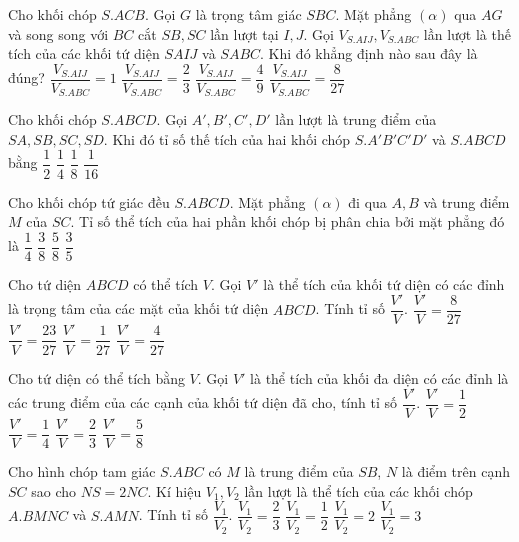 \begin{ex}%
	Cho khối chóp $S.ACB$. Gọi $G$ là trọng tâm giác $SBC$. Mặt phẳng $(\alpha)$ qua $AG$ và song song với $BC$ cắt $SB, SC$ lần lượt tại $I, J$. Gọi $V_{S.AIJ}, V_{S.ABC}$ lần lượt là thế tích của các khối tứ diện $SAIJ$ và $SABC$. Khi đó khẳng định nào sau đây là đúng?
	\choice
	{$\dfrac{V_{S.AIJ}}{V_{S.ABC}}=1$}
	{$\dfrac{V_{S.AIJ}}{V_{S.ABC}}=\dfrac{2}{3}$}
	{\True $\dfrac{V_{S.AIJ}}{V_{S.ABC}}=\dfrac{4}{9}$}
	{$\dfrac{V_{S.AIJ}}{V_{S.ABC}}=\dfrac{8}{27}$}
\end{ex}

\begin{ex}%
	Cho khối chóp $S.ABCD$. Gọi $A', B', C', D'$ lần lượt là trung điểm của $SA, SB, SC, SD$. Khi đó tỉ số thế tích của hai khối chóp $S.A'B'C'D'$ và $S.ABCD$ bằng 
	\choice
	{$\dfrac{1}{2}$}
	{$\dfrac{1}{4}$}
	{\True $\dfrac{1}{8}$}
	{$\dfrac{1}{16}$}
\end{ex}

\begin{ex}%
	Cho khối chóp tứ giác đều $S.ABCD$. Mặt phẳng $(\alpha)$ đi qua $A, B$ và trung điểm $M$ của $SC$. Tỉ số thể tích của hai phần khối chóp bị phân chia bởi mặt phẳng đó là
	\choice
	{$\dfrac{1}{4}$}
	{$\dfrac{3}{8}$}
	{$\dfrac{5}{8}$}
	{\True $\dfrac{3}{5}$}
\end{ex}

\begin{ex}%
	Cho tứ diện $ABCD$ có thể tích $V$. Gọi $V'$ là thể tích của khối tứ diện có các đỉnh là trọng tâm của các mặt của khối tứ diện $ABCD$. Tính tỉ số $\dfrac{V'}{V}$. 
	\choice
	{$\dfrac{V'}{V}=\dfrac{8}{27}$}
	{$\dfrac{V'}{V}=\dfrac{23}{27}$}
	{\True $\dfrac{V'}{V}=\dfrac{1}{27}$}
	{$\dfrac{V'}{V}=\dfrac{4}{27}$}
\end{ex}

\begin{ex}%
	Cho tứ diện có thể tích bằng $V$. Gọi $V'$ là thể tích của khối đa diện có các đỉnh là các trung điểm của các cạnh của khối tứ diện đã cho, tính tỉ số $\dfrac{V'}{V}$. 
	\choice
	{\True $\dfrac{V'}{V}=\dfrac{1}{2}$}
	{$\dfrac{V'}{V}=\dfrac{1}{4}$}
	{$\dfrac{V'}{V}=\dfrac{2}{3}$}
	{$\dfrac{V'}{V}=\dfrac{5}{8}$}
\end{ex}

\begin{ex}%
	Cho hình chóp tam giác $S.ABC$ có $M$ là trung điểm của $SB$, $N$ là điểm trên cạnh $SC$ sao cho $NS=2NC$. Kí hiệu $V_1,V_2$ lần lượt là thể tích của các khối chóp $A.BMNC$ và $S.AMN$. Tính tỉ số $\dfrac{V_1}{V_2}$. 
	\choice
	{$\dfrac{V_1}{V_2}=\dfrac{2}{3}$}
	{$\dfrac{V_1}{V_2}=\dfrac{1}{2}$}
	{\True $\dfrac{V_1}{V_2}=2$}
	{$\dfrac{V_1}{V_2}=3$}
\end{ex}

